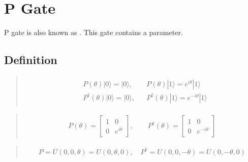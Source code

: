 \documentclass[letterpaper,10pt,english]{jupyterBook}
\begin{document}
\section{P Gate}
\label{\detokenize{q1gates/p:p-gate}}\label{\detokenize{q1gates/p::doc}}
\sphinxAtStartPar
P gate is also known as .  This gate contains a parameter.

\sphinxAtStartPar
{}


\subsection{Definition}
\label{\detokenize{q1gates/p:definition}}
\sphinxAtStartPar
{}
\begin{quote}
\begin{equation*}
\begin{split}
\begin{align}
&P(\theta) |0\rangle = |0\rangle, && P(\theta) |1\rangle = e^{i \theta}|1\rangle\\
&P^\dagger(\theta) |0\rangle = |0\rangle, && P^\dagger(\theta) |1\rangle = e^{-i \theta}|1\rangle
\end{align}
\end{split}
\end{equation*}\end{quote}

\sphinxAtStartPar
{}
\begin{quote}
\begin{equation*}
\begin{split}
P(\theta) = \begin{bmatrix}1&0\\0&e^{i \theta}\end{bmatrix}, \qquad P^\dagger(\theta) = \begin{bmatrix}1&0\\0&e^{-i \theta}\end{bmatrix}
\end{split}
\end{equation*}\end{quote}

\sphinxAtStartPar
{}
\begin{quote}
\begin{equation*}
\begin{split}
P = U\left(0,0,\theta \right) = U\left(0,\theta,0 \right), \quad P^\dagger = U\left(0,0,-\theta\right)= U\left(0,-\theta,0\right)
\end{split}
\end{equation*}\end{quote}
\end{document}

